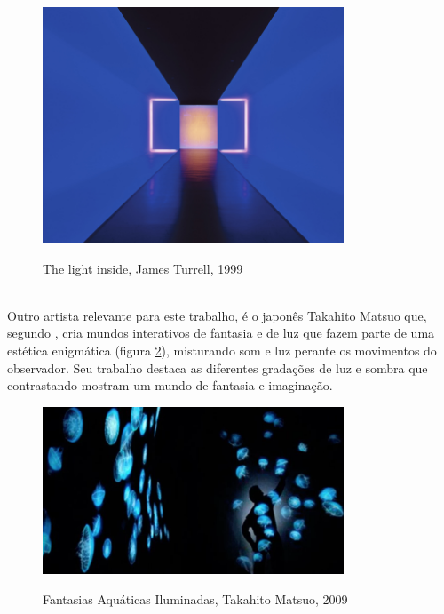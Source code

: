 \begin{figure}[H]
    \centering
    \caption{The light inside, James Turrell, 1999}
	\vspace*{0,2cm}
    \includegraphics[width=0.8\textwidth]{./04-figuras/james_turrell}
    \label{fig:james_turrell}
\end{figure}
\vspace*{-0,9cm}
{\raggedright {}}\\


Outro artista relevante para este trabalho, é o japonês Takahito Matsuo que, segundo , cria mundos interativos de fantasia e de luz que fazem parte de uma estética enigmática (figura \ref{fig:takahito_matsuo}), misturando som e luz perante os movimentos do observador. Seu trabalho destaca as diferentes gradações de luz e sombra que contrastando mostram um mundo de fantasia e imaginação.

\begin{figure}[H]
    \centering
    \caption{Fantasias Aquáticas Iluminadas, Takahito Matsuo, 2009}
	\vspace*{0,2cm}
    \includegraphics[width=0.8\textwidth]{./04-figuras/takahito_matsuo}
    \label{fig:takahito_matsuo}
\end{figure}
\vspace*{-0,9cm}
{\raggedright {}}\\

